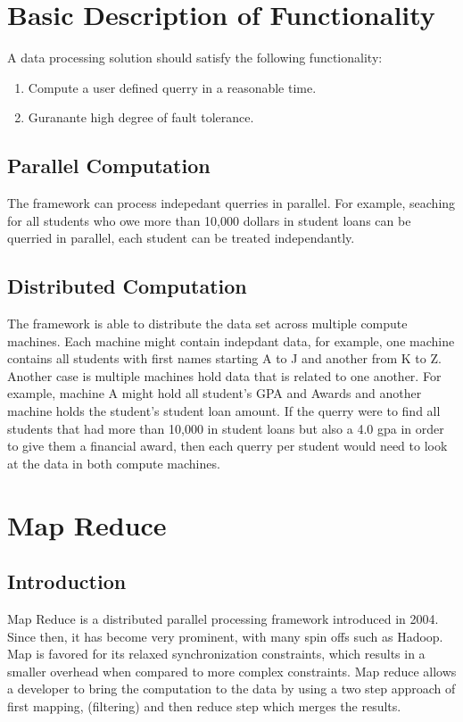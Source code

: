 \documentclass[10pt,twocolumn]{IEEEtran11}
\begin{document}
\section{Basic Description of Functionality}

A data processing solution should satisfy the following functionality:
\begin{enumerate}	
	\item Compute a user defined querry in a reasonable time.
	\item Guranante high degree of fault tolerance.
\end{enumerate}

\subsection{Parallel Computation}
The framework can process indepedant querries in parallel.  For example, seaching for all students who owe more than 10,000 dollars in student loans
can be querried in parallel, each student can be treated independantly.

\subsection{Distributed Computation}
The framework is able to distribute the data set across multiple compute machines.  Each machine might contain indepdant data, for example, one machine contains all students with first names starting A to J and another from K to Z.  Another case is multiple machines hold data that is related to one another.  For example, machine A might hold all student's GPA and Awards and another machine holds the student's student loan amount.
If the querry were to find all students that had more than 10,000 in student loans but also a 4.0 gpa in order to give them a financial award, then each querry per student would need to look at the data in both compute machines.

 
\section{Map Reduce}
\subsection{Introduction}
Map Reduce is a distributed parallel processing framework introduced in 2004\cite{dean2001mapreduce}.  Since then, it has become very prominent, with many spin offs such as Hadoop.  Map is favored for its relaxed synchronization constraints, which results in a smaller overhead when compared to more complex constraints.  Map reduce allows a developer to bring the computation to the data by using a two step approach of first mapping, (filtering) and then reduce step which merges the results.
\end{document}
